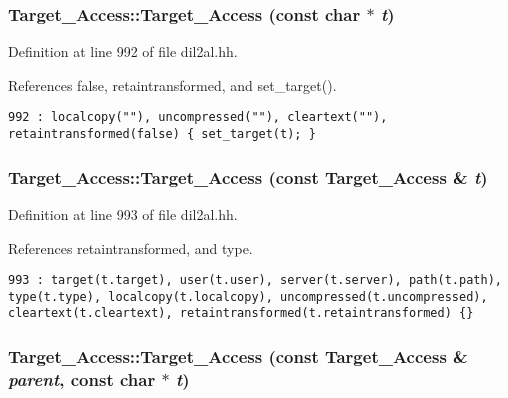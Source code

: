 \subsubsection{\setlength{\rightskip}{0pt plus 5cm}Target\_\-Access::Target\_\-Access (const char $\ast$ {\em t})\hspace{0.3cm}{\tt  [inline]}}\label{classTarget__Access_a0}




Definition at line 992 of file dil2al.hh.

References false, retaintransformed, and set\_\-target().



\footnotesize\begin{verbatim}992 : localcopy(""), uncompressed(""), cleartext(""), retaintransformed(false) { set_target(t); }
\end{verbatim}\normalsize 
{}
\subsubsection{\setlength{\rightskip}{0pt plus 5cm}Target\_\-Access::Target\_\-Access (const Target\_\-Access \& {\em t})\hspace{0.3cm}{\tt  [inline]}}\label{classTarget__Access_a1}




Definition at line 993 of file dil2al.hh.

References retaintransformed, and type.



\footnotesize\begin{verbatim}993 : target(t.target), user(t.user), server(t.server), path(t.path), type(t.type), localcopy(t.localcopy), uncompressed(t.uncompressed), cleartext(t.cleartext), retaintransformed(t.retaintransformed) {}
\end{verbatim}\normalsize 
{}
\subsubsection{\setlength{\rightskip}{0pt plus 5cm}Target\_\-Access::Target\_\-Access (const Target\_\-Access \& {\em parent}, const char $\ast$ {\em t})\hspace{0.3cm}{\tt  [inline]}}\label{classTarget__Access_a2}





